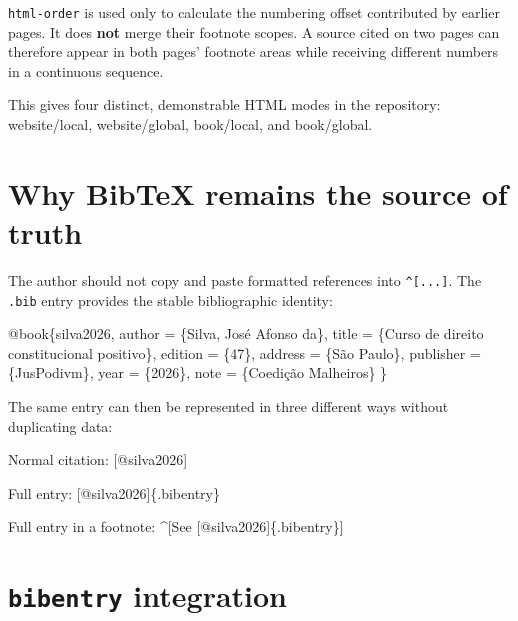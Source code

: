 \documentclass[
  letterpaper,
  DIV=11,
  numbers=noendperiod]{scrartcl}
\newenvironment{Shaded}{\begin{snugshade}}{\end{snugshade}}
\newcommand{\DataTypeTok}[1]{\textcolor[rgb]{0.68,0.00,0.00}{#1}}
\newcommand{\NormalTok}[1]{\textcolor[rgb]{0.00,0.23,0.31}{#1}}
\newcommand{\OtherTok}[1]{\textcolor[rgb]{0.00,0.23,0.31}{#1}}
\newcommand{\VariableTok}[1]{\textcolor[rgb]{0.07,0.07,0.07}{#1}}
\begin{document}
\texttt{html-order} is used only to calculate the numbering offset
contributed by earlier pages. It does \textbf{not} merge their footnote
scopes. A source cited on two pages can therefore appear in both pages'
footnote areas while receiving different numbers in a continuous
sequence.

This gives four distinct, demonstrable HTML modes in the repository:
website/local, website/global, book/local, and book/global.

\section{Why BibTeX remains the source of
truth}\label{why-bibtex-remains-the-source-of-truth}

The author should not copy and paste formatted references into
\texttt{\^{}{[}...{]}}. The \texttt{.bib} entry provides the stable
bibliographic identity:

\begin{Shaded}
\begin{Highlighting}[]
\VariableTok{@book}\NormalTok{\{}\OtherTok{silva2026}\NormalTok{,}
  \DataTypeTok{author}\NormalTok{    = \{Silva, José Afonso da\},}
  \DataTypeTok{title}\NormalTok{     = \{Curso de direito constitucional positivo\},}
  \DataTypeTok{edition}\NormalTok{   = \{47\},}
  \DataTypeTok{address}\NormalTok{   = \{São Paulo\},}
  \DataTypeTok{publisher}\NormalTok{ = \{JusPodivm\},}
  \DataTypeTok{year}\NormalTok{      = \{2026\},}
  \DataTypeTok{note}\NormalTok{      = \{Coedição Malheiros\}}
\NormalTok{\}}
\end{Highlighting}
\end{Shaded}

The same entry can then be represented in three different ways without
duplicating data:

\begin{Shaded}
\begin{Highlighting}[]
\NormalTok{Normal citation: [@silva2026]}

\NormalTok{Full entry: [@silva2026]\{.bibentry\}}

\NormalTok{Full entry in a footnote: \^{}[See [@silva2026]\{.bibentry\}]}
\end{Highlighting}
\end{Shaded}

\section{\texorpdfstring{\texttt{bibentry}
integration}{bibentry integration}}\label{bibentry-integration}
\end{document}
